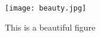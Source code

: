 \begin{figure}[h]
	\centering
	\texttt{[image: beauty.jpg]}	%
	\caption{This is a beautiful figure}
	\label{fig:beauty}
\end{figure}
